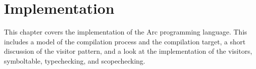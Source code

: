\chapter{Implementation}\label{cha:implementation}
This chapter covers the implementation of the Arc programming language. This includes a model of the compilation process and the compilation target, a short discussion of the visitor pattern, and a look at the implementation of the visitors, symboltable, typechecking, and scopechecking.














